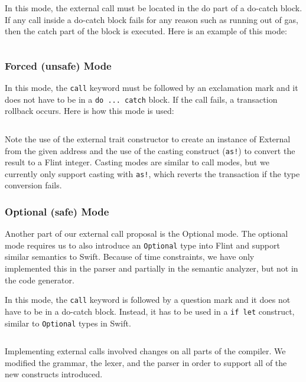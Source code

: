 In this mode, the external call must be located in the do part of a do-catch block. If any call inside a do-catch block fails for any reason such as running out of gas, then the catch part of the block is executed. Here is an example of this mode:

\inputminted{swift}{code/xcall-2.flint}

\subsubsection{Forced (unsafe) Mode}

In this mode, the \texttt{call} keyword must be followed by an exclamation mark and it does not have to be in a \texttt{do ... catch} block. If the call fails, a transaction rollback occurs. Here is how this mode is used:

\inputminted{swift}{code/xcall-3.flint}

Note the use of the external trait constructor to create an instance of External from the given address and the use of the casting construct (\texttt{as!}) to convert the result to a Flint integer. Casting modes are similar to call modes, but we currently only support casting with \texttt{as!}, which reverts the transaction if the type conversion fails.

\subsubsection{Optional (safe) Mode}

Another part of our external call proposal is the Optional mode. The optional mode requires us to also introduce an \texttt{Optional} type into Flint and support similar semantics to Swift. Because of time constraints, we have only implemented this in the parser and partially in the semantic analyzer, but not in the code generator.

In this mode, the \texttt{call} keyword is followed by a question mark and it does not have to be in a do-catch block. Instead, it has to be used in a \texttt{if let} construct, similar to \texttt{Optional} types in Swift.

\inputminted{swift}{code/xcall-4.flint}

Implementing external calls involved changes on all parts of the compiler. We modified the grammar, the lexer, and the parser in order to support all of the new constructs introduced. 

